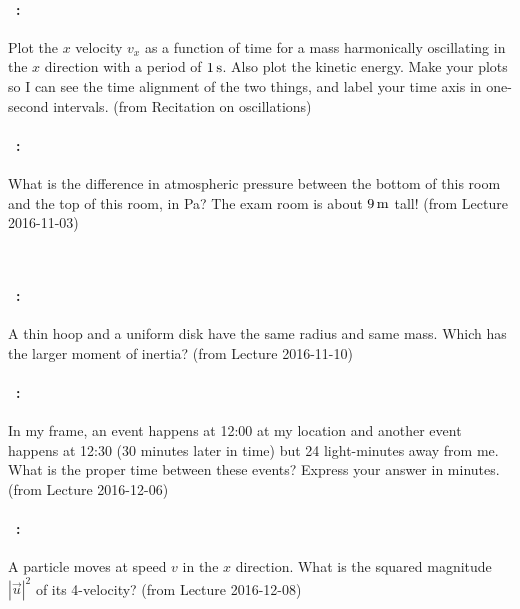 \documentclass[12pt]{article} 
\begin{document}
\vfill

\paragraph{\problemname~\theproblem:}%
Plot the $x$ velocity $v_x$ as a function of time for a mass
harmonically oscillating in the $x$ direction with a period of
$1\,\mathrm{s}$. Also plot the kinetic energy. Make your plots so I can see
the time alignment of the two things, and label your time axis in one-second intervals.
%
(from Recitation on oscillations)

\vfill

\paragraph{\problemname~\theproblem:}%
What is the difference in atmospheric pressure between the bottom of
this room and the top of this room, in Pa? The exam room is about
$9\,\mathrm{m}$ tall!
%
(from Lecture 2016-11-03)

\vfill
~
\clearpage

\paragraph{\problemname~\theproblem:}%
A thin hoop and a uniform disk have the same radius and same mass.
Which has the larger moment of inertia?
%
(from Lecture 2016-11-10)

\vfill

\paragraph{\problemname~\theproblem:}%
In my frame, an event happens at 12:00 at my location and another
event happens at 12:30 (30 minutes later in time) but 24 light-minutes
away from me. What is the proper time between these events? Express
your answer in minutes.
%
(from Lecture 2016-12-06)

\vfill

\paragraph{\problemname~\theproblem:}%
A particle moves at speed $v$ in the $x$ direction. What is the
squared magnitude $|\vec{u}|^2$ of its 4-velocity?
%
(from Lecture 2016-12-08)

\vfill
~
\end{document}
